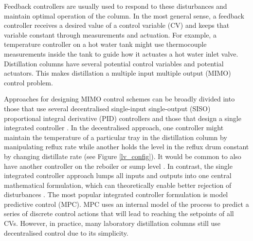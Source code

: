 Feedback controllers are usually used to respond to these disturbances and maintain optimal operation of the column.  In the most general sense, a feedback controller receives a desired value of a control variable (CV) and keeps that variable constant through measurements and actuation. For example, a temperature controller on a hot water tank might use thermocouple measurements inside the tank to guide how it actuates a hot water inlet valve. Distillation columns have several potential control variables and potential actuators. This makes distillation a multiple input multiple output (MIMO) control problem. 

Approaches for designing MIMO control schemes can be broadly divided into those that use several decentralised single-input single-output (SISO) proportional integral derivative (PID) controllers\cite{Behroozsarand2012, Shen1994, Lin2006, Luyben1986} and those that design a single integrated controller \cite{Martin2013, Mesbah2017,Spielberg2019,Terzi2020}. In the decentralised approach, one controller might maintain the temperature of a particular tray in the distillation column by manipulating reflux rate while another holds the level in the reflux drum constant by changing distillate rate (see Figure \ref{lv_config}). It would be common to also have another controller on the reboiler or sump level \cite{Skogestad2007}. In contrast, the single integrated controller approach lumps all inputs and outputs into one central mathematical formulation, which can theoretically enable better rejection of disturbances \cite{Mesbah2017}. The most popular integrated controller formulation is model predictive control (MPC). MPC uses an internal model of the process to predict a series of discrete control actions that will lead to reaching the setpoints of all CVs.  However, in practice, many laboratory distillation columns still use decentralised control due to its simplicity.


